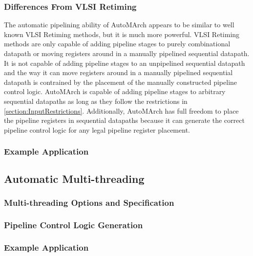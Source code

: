 \subsubsection{Differences From VLSI Retiming}
The automatic pipelining ability of AutoMArch appears to be similar to well known VLSI Retiming methods, but it is much more powerful. VLSI Retiming methods are only capable of adding pipeline stages to purely combinational datapath or moving registers around in a manually pipelined sequential datapath. It is not capable of adding pipeline stages to an unpipelined sequential datapath and the way it can move registers around in a manually pipelined sequential datapath is contrained by the placement of the manually constructed pipeline control logic. AutoMArch is capable of adding pipeline stages to arbitrary sequential datapaths as long as they follow the restrictions in \ref{section:InputRestrictions}. Additionally, AutoMArch has full freedom to place the pipeline registers in sequential datapaths because it can generate the correct pipeline control logic for any legal pipeline register placement.

\subsubsection{Example Application}

\subsection{Automatic Multi-threading}
\subsubsection{Multi-threading Options and Specification}
\subsubsection{Pipeline Control Logic Generation}
\subsubsection{Example Application}
